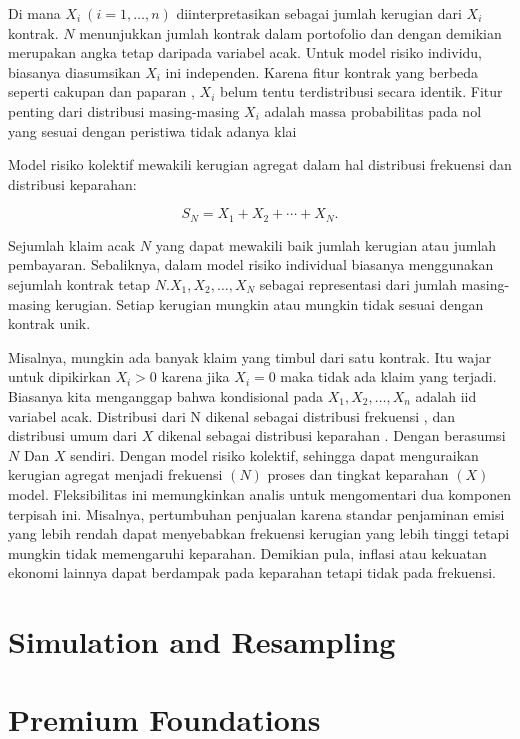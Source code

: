 \documentclass[
]{book}
\begin{document}
Di mana \(X_i~(i=1,\ldots,n)\) diinterpretasikan sebagai jumlah kerugian dari \(X_i\) kontrak. \(N\) menunjukkan jumlah kontrak dalam portofolio dan dengan demikian merupakan angka tetap daripada variabel acak. Untuk model risiko individu, biasanya diasumsikan \(X_i\) ini independen. Karena fitur kontrak yang berbeda seperti cakupan dan paparan , \(X_i\) belum tentu terdistribusi secara identik. Fitur penting dari distribusi masing-masing \(X_i\) adalah massa probabilitas pada nol yang sesuai dengan peristiwa tidak adanya klai

Model risiko kolektif mewakili kerugian agregat dalam hal distribusi frekuensi dan distribusi keparahan:

\[S_N=X_1 +X_2 + \cdots + X_N .\]

Sejumlah klaim acak \(N\) yang dapat mewakili baik jumlah kerugian atau jumlah pembayaran. Sebaliknya, dalam model risiko individual biasanya menggunakan sejumlah kontrak tetap \(N\).\(X_1, X_2, \ldots, X_N\) sebagai representasi dari jumlah masing-masing kerugian. Setiap kerugian mungkin atau mungkin tidak sesuai dengan kontrak unik.

Misalnya, mungkin ada banyak klaim yang timbul dari satu kontrak. Itu wajar untuk dipikirkan \(X_i>0\) karena jika \(X_i=0\) maka tidak ada klaim yang terjadi. Biasanya kita menganggap bahwa kondisional pada \(X_{1},X_{2},\ldots ,X_{n}\) adalah iid variabel acak. Distribusi dari N dikenal sebagai distribusi frekuensi , dan distribusi umum dari \(X\) dikenal sebagai distribusi keparahan . Dengan berasumsi \(N\) Dan \(X\) sendiri. Dengan model risiko kolektif, sehingga dapat menguraikan kerugian agregat menjadi frekuensi \(( N )\) proses dan tingkat keparahan \(( X )\) model. Fleksibilitas ini memungkinkan analis untuk mengomentari dua komponen terpisah ini. Misalnya, pertumbuhan penjualan karena standar penjaminan emisi yang lebih rendah dapat menyebabkan frekuensi kerugian yang lebih tinggi tetapi mungkin tidak memengaruhi keparahan. Demikian pula, inflasi atau kekuatan ekonomi lainnya dapat berdampak pada keparahan tetapi tidak pada frekuensi.

\hypertarget{simulation-and-resampling}{%
\chapter{Simulation and Resampling}\label{simulation-and-resampling}}

\hypertarget{premium-foundations}{%
\chapter{Premium Foundations}\label{premium-foundations}}
\end{document}
